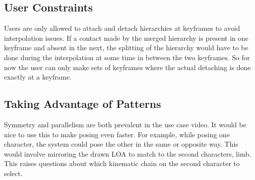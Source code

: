 \subsection{User Constraints}
Users are only allowed to attach and detach hierarchies at keyframes to avoid interpolation issues. If a contact made by the merged hierarchy is present in one keyframe and absent in the next, the splitting of the hierarchy would have to be done during the interpolation at some time in between the two keyframes. So for now the user can only make sets of keyframes where the actual detaching is done exactly at a keyframe.

\subsection{Taking Advantage of Patterns}
Symmetry and parallelism are both prevalent in the use case video. It would be nice to use this to make posing even faster. For example, while posing one character, the system could pose the other in the same or opposite way. This would involve mirroring the drawn LOA to match to the second characters, limb. This raises questions about which kinematic chain on the second character to select. 

